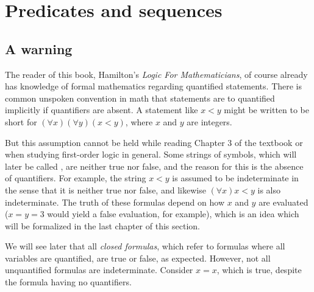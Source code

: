 
\section{Predicates and sequences}

\subsection*{A warning}

The reader of this book, Hamilton's \textit{Logic For Mathematicians}, of course already has knowledge of formal mathematics regarding quantified statements. There is common unspoken convention in math that statements are to quantified implicitly if quantifiers are absent. A statement like \(x < y\) might be written to be short for \((\forall x) (\forall y) (x < y)\), where \(x\) and \(y\) are integers.

But this assumption cannot be held while reading Chapter 3 of the textbook or when studying first-order logic in general. Some strings of symbols, which will later be called \wfs{}, are neither true nor false, and the reason for this is the absence of quantifiers. For example, the string \(x < y\) is assumed to be indeterminate in the sense that it is neither true nor false, and likewise \((\forall x) x < y\) is also indeterminate. The truth of these formulas depend on how \(x\) and \(y\) are evaluated (\(x = y = 3\) would yield a false evaluation, for example), which is an idea which will be formalized in the last chapter of this section.

We will see later that all \textit{closed formulas}, which refer to formulas where all variables are quantified, are true or false, as expected. However, not all unquantified formulas are indeterminate. Consider \(x = x\), which is true, despite the formula having no quantifiers.

\solutions{}

